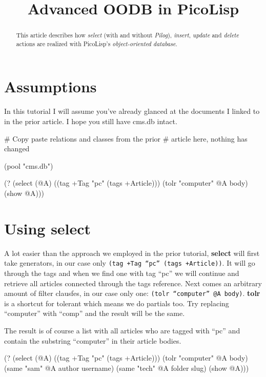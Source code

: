 \title{Advanced OODB in PicoLisp}

\maketitle


\begin{abstract}
This article describes how \emph{select} (with and without
\emph{Pilog}), \emph{insert}, \emph{update} and \emph{delete} actions
are realized with PicoLisp's \emph{object-oriented database}.
\end{abstract}

\section{Assumptions}
\label{sec:advanced-oodb}

In this tutorial I will assume you've already glanced at the documents I
linked to in the prior article. I hope you still have cms.db intact.


\begin{wideverbatim}
# Copy paste relations and classes from the prior 
# article here, nothing has changed

(pool "cms.db")

(? 
 (select (@A) 
         ((tag +Tag "pc" (tags +Article)))
         (tolr "computer" @A body) 
 (show @A)))
\end{wideverbatim}

\section{Using select}
\label{sec:advanced-oodb}

A lot easier than the approach we employed in the prior tutorial,
\textbf{select} will first take generators, in our case only
\texttt{(tag +Tag ``pc'' (tags +Article))}. It will go through the
tags and when we find one with tag ``pc'' we will continue and
retrieve all articles connected through the tags reference. Next comes
an arbitrary amount of filter clausfes, in our case only one: \texttt{(tolr
``computer'' @A body)}. \textbf{tolr} is a shortcut for tolerant which
means we do partials too. Try replacing ``computer'' with ``comp'' and
the result will be the same.

The result is of course a list with all articles who are tagged with
``pc'' and contain the substring ``computer'' in their article bodies.

\begin{wideverbatim}
(? 
 (select (@A) 
         ((tag +Tag "pc" (tags +Article)))
         (tolr "computer" @A body)
         (same "sam" @A author username)
         (same "tech" @A folder slug)
 (show @A)))
\end{wideverbatim}

